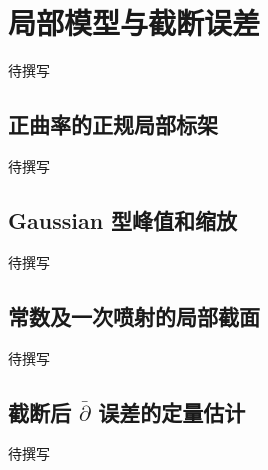 
% 
% 

\section{局部模型与截断误差}
\label{g4:sec:1902}

待撰写

\subsection{正曲率的正规局部标架}
\label{g4:subsec:1902:01}
待撰写

\subsection{Gaussian 型峰值和缩放}
\label{g4:subsec:1902:02}
待撰写

\subsection{常数及一次喷射的局部截面}
\label{g4:subsec:1902:03}
待撰写

\subsection{\texorpdfstring{截断后 \(\bar{\partial}\) 误差的定量估计}{截断后 \={∂} 误差的定量估计}}
\label{g4:subsec:1902:04}
待撰写
